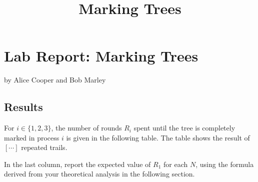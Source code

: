 \documentclass{tufte-handout}
\title{Marking Trees}
\date{}
\author{}
\begin{document}
\maketitle

\section{Lab Report: Marking Trees}


by Alice Cooper and Bob Marley

\subsection{Results}


For $i \in \{1, 2, 3\}$, the number of rounds $R_i$ spent until the tree is completely marked in process $i$ is given in the following table. The table shows the result of $[\cdots]$ repeated trails.

In the last column, report the expected value of $R_1$ for each $N$, using the formula derived from your theoretical analysis in the following section.
\end{document}
